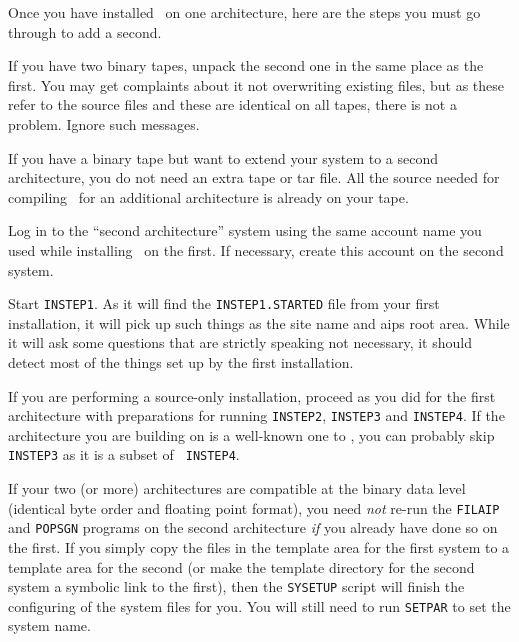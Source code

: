 Once you have installed \AIPS\ on one architecture, here are the steps
you must go through to add a second. \medskip

\item{\bul} If you have two binary tapes, unpack the second one in the
        same place as the first.  You may get complaints about it not
        overwriting existing files, but as these refer to the source files
        and these are identical on all tapes, there is not a problem.
        Ignore such messages.
\item{\bul} If you have a binary tape but want to extend your system to a
        second architecture, you do not need an extra tape or tar file.
        All the source needed for compiling \AIPS\ for an additional
        architecture is already on your tape.
\item{\bul} Log in to the ``second architecture'' system using the same
        account name you used while installing \AIPS\ on the first.  If
        necessary, create this account on the second system.
\item{\bul} Start {\tt INSTEP1}.  As it will find the {\tt INSTEP1.STARTED}
        file from your first installation, it will pick up such things as
        the site name and aips root area.  While it will ask some
        questions that are strictly speaking not necessary, it should
        detect most of the things set up by the first installation.
\item{\bul} If you are performing a source-only installation, proceed as
        you did for the first architecture with preparations for running
        {\tt INSTEP2}, {\tt INSTEP3} and {\tt INSTEP4}.  If the
        architecture you are building on is a well-known one to \AIPS,
        you can probably skip {\tt INSTEP3} as it is a subset of {\tt
        INSTEP4}.

\medskip\noindent If your two (or more) architectures are compatible at
the binary data level (identical byte order and floating point format),
you need {\it not\/} re-run the {\tt FILAIP} and {\tt POPSGN} programs on
the second architecture {\it if\/} you already have done so on the first.
If you simply copy the files in the template area for the first system to
a template area for the second (or make the template directory for the
second system a symbolic link to the first), then the {\tt SYSETUP} script
will finish the configuring of the system files for you.  You will still
need to run {\tt SETPAR} to set the system name.

\medskip{}

